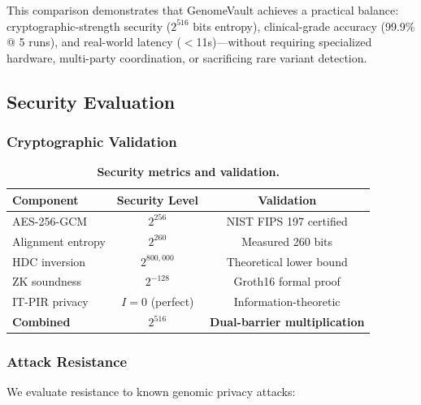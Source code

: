 \documentclass[12pt,a4paper]{article}
\begin{document}
This comparison demonstrates that GenomeVault achieves a practical balance: cryptographic-strength security ($2^{516}$ bits entropy), clinical-grade accuracy (99.9\% @ 5 runs), and real-world latency ($<$11s)---without requiring specialized hardware, multi-party coordination, or sacrificing rare variant detection.

\subsection{Security Evaluation}

\subsubsection{Cryptographic Validation}

\begin{table}[h]
\centering
\caption{\textbf{Security metrics and validation.}}
\begin{tabular}{lcc}
\toprule
\textbf{Component} & \textbf{Security Level} & \textbf{Validation} \\
\midrule
AES-256-GCM & $2^{256}$ & NIST FIPS 197 certified \\
Alignment entropy & $2^{260}$ & Measured 260 bits \\
HDC inversion & $2^{800,000}$ & Theoretical lower bound \\
ZK soundness & $2^{-128}$ & Groth16 formal proof \\
IT-PIR privacy & $I=0$ (perfect) & Information-theoretic \\
\midrule
\textbf{Combined} & \textbf{$2^{516}$} & \textbf{Dual-barrier multiplication} \\
\bottomrule
\end{tabular}
\end{table}

\subsubsection{Attack Resistance}

We evaluate resistance to known genomic privacy attacks:
\end{document}
